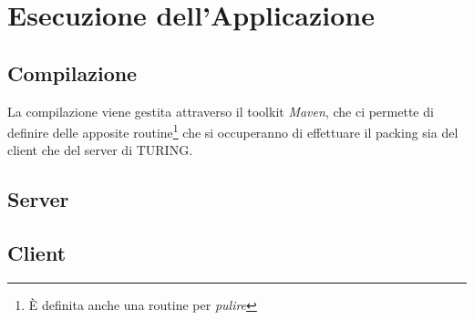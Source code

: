 \section{Esecuzione dell'Applicazione}
\subsection{Compilazione}
La compilazione viene gestita attraverso il toolkit \textit{Maven}, che ci permette di definire delle apposite routine\footnote{È definita anche una routine per \textit{pulire}} che si occuperanno di effettuare il packing sia del client che del server di TURING.\\


\subsection{Server}
\subsection{Client}